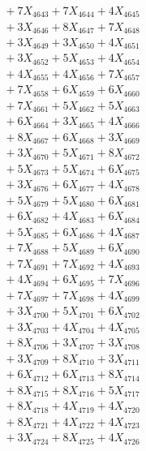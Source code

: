 \documentclass[a4paper,10pt]{article}
\begin{document}
{\begin{align}
&\;  + 7 X_{4643} + 7 X_{4644} + 4 X_{4645} \\[0.3ex]
&\;  + 3 X_{4646} + 8 X_{4647} + 7 X_{4648} \\[0.3ex]
&\;  + 3 X_{4649} + 3 X_{4650} + 4 X_{4651} \\[0.3ex]
&\;  + 3 X_{4652} + 5 X_{4653} + 4 X_{4654} \\[0.3ex]
&\;  + 4 X_{4655} + 4 X_{4656} + 7 X_{4657} \\[0.3ex]
&\;  + 7 X_{4658} + 6 X_{4659} + 6 X_{4660} \\[0.5ex]\allowbreak
&\;  + 7 X_{4661} + 5 X_{4662} + 5 X_{4663} \\[0.3ex]
&\;  + 6 X_{4664} + 3 X_{4665} + 4 X_{4666} \\[0.3ex]
&\;  + 8 X_{4667} + 6 X_{4668} + 3 X_{4669} \\[0.3ex]
&\;  + 3 X_{4670} + 5 X_{4671} + 8 X_{4672} \\[0.3ex]
&\;  + 5 X_{4673} + 5 X_{4674} + 6 X_{4675} \\[0.3ex]
&\;  + 3 X_{4676} + 6 X_{4677} + 4 X_{4678} \\[0.3ex]
&\;  + 5 X_{4679} + 5 X_{4680} + 6 X_{4681} \\[0.3ex]
&\;  + 6 X_{4682} + 4 X_{4683} + 6 X_{4684} \\[0.3ex]
&\;  + 5 X_{4685} + 6 X_{4686} + 4 X_{4687} \\[0.3ex]
&\;  + 7 X_{4688} + 5 X_{4689} + 6 X_{4690} \\[0.5ex]\allowbreak
&\;  + 7 X_{4691} + 7 X_{4692} + 4 X_{4693} \\[0.3ex]
&\;  + 4 X_{4694} + 6 X_{4695} + 7 X_{4696} \\[0.3ex]
&\;  + 7 X_{4697} + 7 X_{4698} + 4 X_{4699} \\[0.3ex]
&\;  + 3 X_{4700} + 5 X_{4701} + 6 X_{4702} \\[0.3ex]
&\;  + 3 X_{4703} + 4 X_{4704} + 4 X_{4705} \\[0.3ex]
&\;  + 8 X_{4706} + 3 X_{4707} + 3 X_{4708} \\[0.3ex]
&\;  + 3 X_{4709} + 8 X_{4710} + 3 X_{4711} \\[0.3ex]
&\;  + 6 X_{4712} + 6 X_{4713} + 8 X_{4714} \\[0.3ex]
&\;  + 8 X_{4715} + 8 X_{4716} + 5 X_{4717} \\[0.3ex]
&\;  + 8 X_{4718} + 4 X_{4719} + 4 X_{4720} \\[0.5ex]\allowbreak
&\;  + 8 X_{4721} + 4 X_{4722} + 4 X_{4723} \\[0.3ex]
&\;  + 3 X_{4724} + 8 X_{4725} + 4 X_{4726} \\[0.3ex]

\end{align}}
\end{document}
